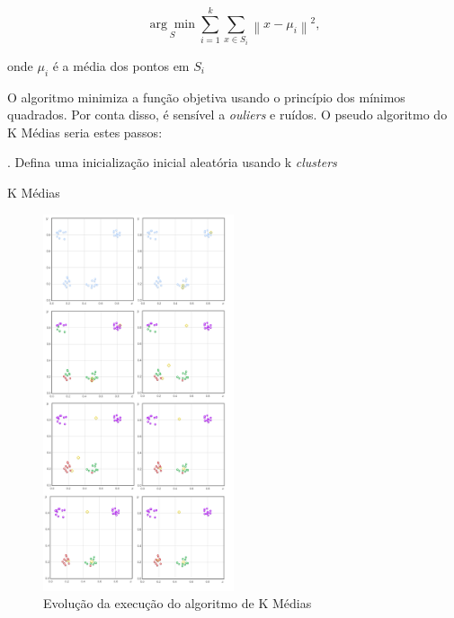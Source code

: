 \begin{equation}
\label{eq:media}
\underset{S}{\arg\min} \sum_{i=1}^{k} \sum_{x \in S_{i}}\left \| x - \mu_{i} \right \|^{2},
\end{equation}

onde \begin{math}\mu_{i}\end{math} é a média dos pontos em \begin{math}S_{i}\end{math}

O algoritmo minimiza a função objetiva usando o princípio dos mínimos quadrados. Por conta disso, é sensível a \emph{ouliers} e ruídos. O pseudo algoritmo do K Médias seria estes passos:\\

\begin{algorithm}[H]
. Defina uma inicialização inicial aleatória usando k \emph{clusters}\;
 \caption{K Médias}
\end{algorithm}

\vspace{5mm}


\begin{figure}[!ht]
\caption{Evolução da execução do algoritmo de K Médias }
\centerline{\includegraphics[width=0.5\textwidth]{img/k-means}}
\end{figure}



